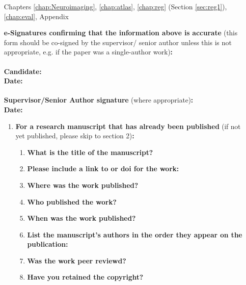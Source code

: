 {\begin{enumerate}[leftmargin=*,label={\bfseries\arabic*.}]
Chapters \ref{chap:Neuroimaging}, \ref{chap:atlas}, \ref{chap:reg} (Section \ref{sec:reg1}), \ref{chap:eval}, Appendix
\end{enumerate}

\textbf{e-Signatures confirming that the information above is accurate}
(this form should be co-signed by the supervisor/ senior author unless this is not appropriate, e.g. if the paper was a single-author work)\textbf{:}\\
\textbf{}\\
\textbf{Candidate:}\\
\textbf{Date:}\\
\textbf{}\\
\textbf{Supervisor/Senior Author signature} (where appropriate)\textbf{:}\\
\textbf{Date:}
%

\newpage
\begin{enumerate}[leftmargin=*,label={\bfseries\arabic*.}]\itemsep0em
	\item \textbf{For a research manuscript that has already been published} (if not yet published, please skip to section 2)\textbf{:}
	\begin{enumerate}[label={\alph*)}]\itemsep0em
	\item \textbf{What is the title of the manuscript?}

	\item \textbf{Please include a link to or doi for the work:}

	\item \textbf{Where was the work published?}

	\item \textbf{Who published the work?}

	\item \textbf{When was the work published?}

	\item \textbf{List the manuscript's authors in the order they appear on the publication:}

	\item \textbf{Was the work peer reviewd?}

	\item \textbf{Have you retained the copyright?}


\end{enumerate}
\end{enumerate}}
